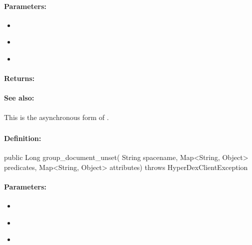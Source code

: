 \paragraph{Parameters:}
\begin{itemize}[noitemsep]
\item {}\\

\item {}\\

\item {}\\

\end{itemize}

\paragraph{Returns:}


\paragraph{See also:}  This is the asynchronous form of .

\pagebreak
\subsubsection{}
\label{api:java:group_document_unset}


\paragraph{Definition:}
\begin{javacode}
public Long group_document_unset(
        String spacename,
        Map<String, Object> predicates,
        Map<String, Object> attributes) throws HyperDexClientException
\end{javacode}

\paragraph{Parameters:}
\begin{itemize}[noitemsep]
\item {}\\

\item {}\\

\item {}\\

\end{itemize}

